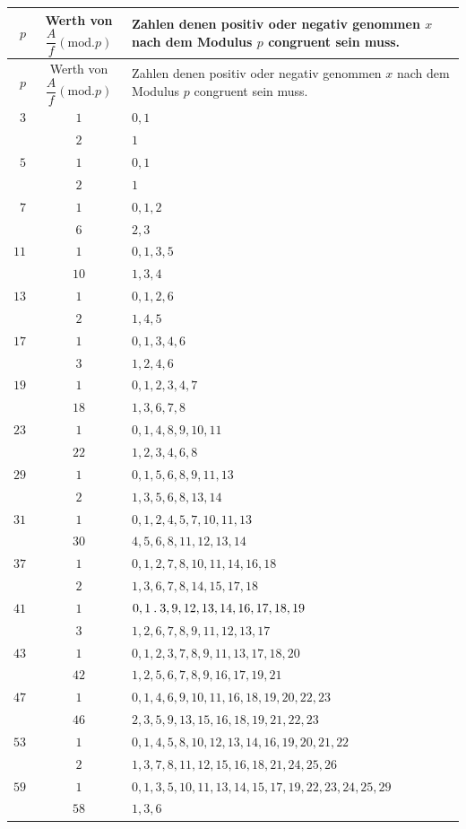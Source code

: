 \clearpage{}
\begingroup\fontsize{9.5}{12}\selectfont\setlength{\tabcolsep}{4pt}\renewcommand{\arraystretch}{1.10}
\begin{longtable}{r|c|p{262pt}}
\hline
$p$ & \shortstack{Werth von\\$\dfrac{A}{f}(\mathrm{mod}.p)$} & Zahlen denen positiv oder negativ genommen $x$ nach dem Modulus $p$ congruent sein muss.\\\hline
\endfirsthead
$p$ & \shortstack{Werth von\\$\dfrac{A}{f}(\mathrm{mod}.p)$} & Zahlen denen positiv oder negativ genommen $x$ nach dem Modulus $p$ congruent sein muss.\\\hline
\endhead
$3$ & $1$ & $0,1$\\
 & $2$ & $1$\\
$5$ & $1$ & $0,1$\\
 & $2$ & $1$\\
$7$ & $1$ & $0,1,2$\\
 & $6$ & $2,3$\\
$11$ & $1$ & $0,1,3,5$\\
 & $10$ & $1,3,4$\\
$13$ & $1$ & $0,1,2,6$\\
 & $2$ & $1,4,5$\\
$17$ & $1$ & $0,1,3,4,6$\\
 & $3$ & $1,2,4,6$\\
$19$ & $1$ & $0,1,2,3,4,7$\\
 & $18$ & $1,3,6,7,8$\\
$23$ & $1$ & $0,1,4,8,9,10,11$\\
 & $22$ & $1,2,3,4,6,8$\\
$29$ & $1$ & $0,1,5,6,8,9,11,13$\\
 & $2$ & $1,3,5,6,8,13,14$\\
$31$ & $1$ & $0,1,2,4,5,7,10,11,13$\\
 & $30$ & $4,5,6,8,11,12,13,14$\\
$37$ & $1$ & $0,1,2,7,8,10,11,14,16,18$\\
 & $2$ & $1,3,6,7,8,14,15,17,18$\\
$41$ & $1$ & $0,1\mathbin{.} 3,9,12,13,14,16,17,18,19$\\
 & $3$ & $1,2,6,7,8,9,11,12,13,17$\\
$43$ & $1$ & $0,1,2,3,7,8,9,11,13,17,18,20$\\
 & $42$ & $1,2,5,6,7,8,9,16,17,19,21$\\
$47$ & $1$ & $0,1,4,6,9,10,11,16,18,19,20,22,23$\\
 & $46$ & $2,3,5,9,13,15,16,18,19,21,22,23$\\
$53$ & $1$ & $0,1,4,5,8,10,12,13,14,16,19,20,21,22$\\
 & $2$ & $1,3,7,8,11,12,15,16,18,21,24,25,26$\\
$59$ & $1$ & $0,1,3,5,10,11,13,14,15,17,19,22,23,24,25,29$\\
 & $58$ & $1,3,6$\\
\end{longtable}\endgroup
